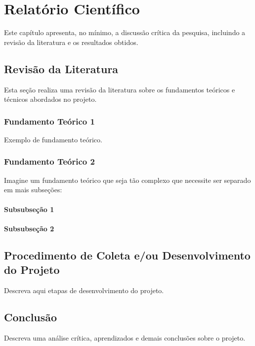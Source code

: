 \chapter{Relatório Científico}

Este capítulo apresenta, no mínimo, a discussão crítica da pesquisa, incluindo a revisão da literatura e os resultados obtidos.

\section{Revisão da Literatura}

Esta seção realiza uma revisão da literatura sobre os fundamentos teóricos e técnicos abordados no projeto.

\subsection{Fundamento Teórico 1}

Exemplo de fundamento teórico.

\subsection{Fundamento Teórico 2}

Imagine um fundamento teórico que seja tão complexo que necessite ser separado em mais subseções:

\subsubsection{Subsubseção 1}

\subsubsection{Subsubseção 2}

\section{Procedimento de Coleta e/ou Desenvolvimento do Projeto}

Descreva aqui etapas de desenvolvimento do projeto.

\section{Conclusão}

Descreva uma análise crítica, aprendizados e demais conclusões sobre o projeto.
